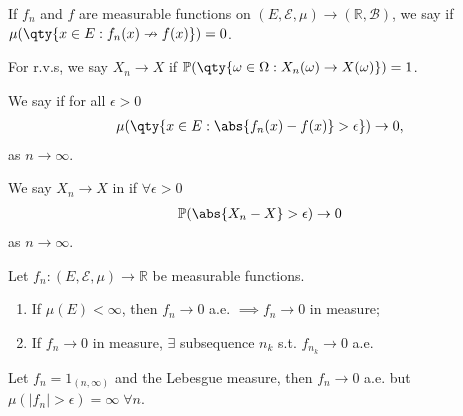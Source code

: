 \begin{definition}
	If $f_n$ and $f$ are measurable functions on $(E,\mathcal E,\mu) \to (\mathbb{R}, \mathcal{B})$, we say  if $\mu(\qty{x \in E : f_n(x) \nrightarrow f(x)}) = 0$.

	For r.v.s, we say $X_n \to X$  if $\mathbb{P}(\qty{\omega \in \Omega : X_n(\omega) \to X(\omega)}) = 1$.
\end{definition}

\begin{definition}
	We say  if for all $\epsilon > 0$
	\begin{align*}
		\mu(\qty{x\in E : \abs{f_n(x) - f(x)} > \epsilon}) \to 0,
	\end{align*} as $n \to \infty$.

	We say $X_n \to X$ in  if $\forall \epsilon > 0$
	\begin{align*}
		\mathbb{P}(\abs{X_n - X} > \epsilon) \to 0
	\end{align*} as $n \to \infty$.
\end{definition}

\begin{theorem} \label{thm:inprobinmeasure}
	Let $f_n \colon (E,\mathcal E,\mu) \to \mathbb R$ be measurable functions.
	\begin{enumerate}
		\item If $\mu(E) < \infty$, then $f_n \to 0$ a.e. $\implies f_n \to 0$ in measure;
		\item If $f_n \to 0$ in measure, $\exists$ subsequence $n_k$ s.t. $f_{n_k} \to 0$ a.e.
	\end{enumerate}
\end{theorem}

\begin{example}
	Let $f_n = 1_{(n, \infty)}$ and the Lebesgue measure, then $f_n \to 0$ a.e. but $\mu(|f_n| > \epsilon) = \infty \; \forall n$.
\end{example}

